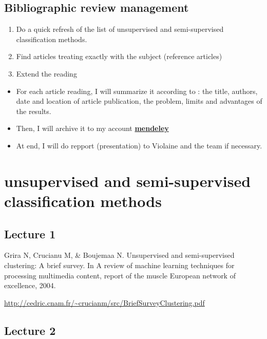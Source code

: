 \documentclass[
]{book}
\providecommand{\tightlist}{%
  \setlength{\itemsep}{0pt}\setlength{\parskip}{0pt}}
\begin{document}
\hypertarget{bibliographic-review-management}{%
\section{Bibliographic review management}\label{bibliographic-review-management}}

\begin{enumerate}
\def\labelenumi{\arabic{enumi}.}
\tightlist
\item
  Do a quick refresh of the list of unsupervised and semi-supervised classification methods.
\item
  Find articles treating exactly with the subject (reference articles)
\item
  Extend the reading
\end{enumerate}

\begin{itemize}
\item
  For each article reading, I will summarize it according to : the title, authors,
  date and location of article publication, the problem, limits and advantages of the results.
\item
  Then, I will archive it to my account \textbf{\href{https://www.mendeley.com/reference-management/reference-manager}{mendeley}}
\item
  At end, I will do repport (presentation) to Violaine and the team if necessary.
\end{itemize}

\hypertarget{unsupervised-and-semi-supervised-classification-methods}{%
\chapter{unsupervised and semi-supervised classification methods}\label{unsupervised-and-semi-supervised-classification-methods}}

\hypertarget{lecture-1}{%
\section{Lecture 1}\label{lecture-1}}

Grira N, Crucianu M, \& Boujemaa N. Unsupervised and semi-supervised clustering:
A brief survey. In A review of machine learning techniques for processing multimedia
content, report of the muscle European network of excellence, 2004.

\url{http://cedric.cnam.fr/~crucianm/src/BriefSurveyClustering.pdf}

\hypertarget{lecture-2}{%
\section{Lecture 2}\label{lecture-2}}
\end{document}
